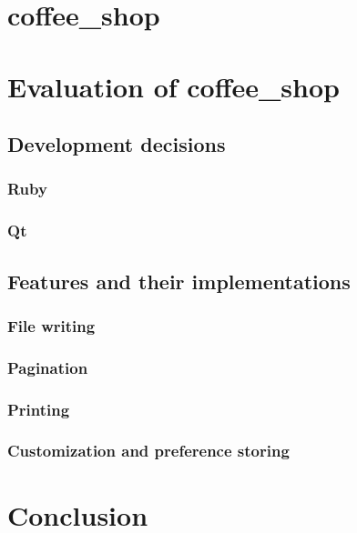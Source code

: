 \documentclass[11pt]{article}
\begin{document}
\section{coffee\_shop}

\section{Evaluation of coffee\_shop}
\subsection{Development decisions}
\subsubsection{Ruby}
\subsubsection{Qt}
\subsection{Features and their implementations}
\subsubsection{File writing}
\subsubsection{Pagination}
\subsubsection{Printing}
\subsubsection{Customization and preference storing}

\section{Conclusion}

\newpage
\nocite{*}


\end{document}
